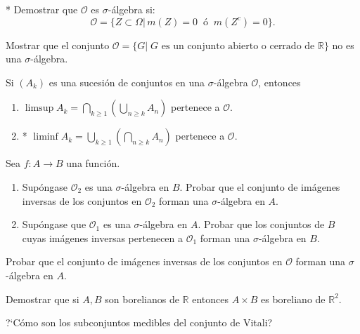 \documentclass{book}
\newcommand{\rr}{\mathbb{R}}
\begin{document}
 \begin{ejer}{}  * 	Demostrar que $\mathscr{O}$ es $\sigma$-álgebra si:
	\[\mathscr{O}=\{Z\subset \Omega|\,m(Z)=0 \;\;\text{ó}\;\; m(Z^c)=0\}.
	\]
	\end{ejer} 


\begin{ejer}{} 
Mostrar que el conjunto $\mathscr{O}=\{G|\; G \text{ es un conjunto abierto o cerrado de } \mathbb{R}\}$ no es una $\sigma$-álgebra. 
\end{ejer} 


\begin{ejer}{} 
Si $(A_k)$ es una sucesi\'on de conjuntos en una $\sigma$-\'algebra $\mathscr{O}$, entonces
\begin{enumerate}
\item $\limsup A_k=\bigcap\limits_{k\geq 1}\left(\bigcup\limits_{n\geq k} A_n\right)$ pertenece a $\mathscr{O}$.
\item * $\liminf A_k=\bigcup\limits_{k\geq 1}\left(\bigcap\limits_{n\geq k} A_n\right)$ pertenece a $\mathscr{O}$.
 \end{enumerate}
 \end{ejer}  





\begin{ejer}{} 
Sea $f: A\to B$ una funci\'on.  
\begin{enumerate}
    \item  Sup\'ongase 
$\mathscr{O}_2$ es una $\sigma$-\'algebra en $B$.  Probar que el conjunto de im\'agenes inversas de los conjuntos en $\mathscr{O}_2$  forman una 
$\sigma$-\'algebra en $A$. 
\item Sup\'ongase que  $\mathscr{O}_1$ es una $\sigma$-\'algebra en $A$.
Probar que los conjuntos de $B$ cuyas im\'agenes inversas pertenecen a $\mathscr{O}_1$ forman una 
$\sigma$-\'algebra en $B$. 
\end{enumerate}
Probar que el conjunto de im\'agenes inversas de los conjuntos en $\mathscr{O}$  forman una 
$\sigma$-\'algebra en $A$. 
\end{ejer}


  

	\begin{ejer}{} Demostrar que si $A,B$ son borelianos de $\rr$ entonces $A\times B$ es boreliano de $\rr^2$. 
	 	\end{ejer}




  
  
   \begin{ejer}{} 
	?`Cómo son los subconjuntos medibles del conjunto de Vitali?
\end{ejer} 
\end{document}
